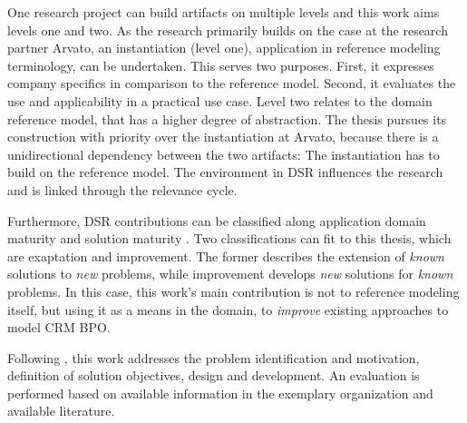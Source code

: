 One research project can build artifacts on multiple levels \citep{gregor2013positioning} and this work aims levels one and two. As the research primarily builds on the case at the research partner Arvato, an instantiation (level one), \viz application in reference modeling terminology, can be undertaken. This serves two purposes. First, it expresses company specifics in comparison to the reference model. Second, it evaluates the use and applicability in a practical use case.  Level two relates to the domain reference model, that has a higher degree of abstraction. The thesis pursues its construction with priority over the instantiation at Arvato, because there is a unidirectional dependency between the two artifacts: The instantiation has to build on the reference model. The environment in \acrshort{DSR} influences the research and is linked through the relevance cycle. 

Furthermore, \acrshort{DSR} contributions can be classified along application domain maturity and solution maturity \citep{gregor2013positioning}. Two classifications can fit to this thesis, which are exaptation and improvement. The former describes the extension of \textit{known} solutions to \textit{new} problems, while improvement develops \textit{new} solutions for \textit{known} problems. In this case, this work's main contribution is not to reference modeling itself, but using it as a means in the domain, to \textit{improve} existing approaches to model CRM BPO. 

Following \citeauthor{Hevner2004,Peffers2007}, this work addresses the problem identification and motivation, definition of solution objectives,  design and development. An evaluation is performed based on available information in the exemplary organization and available literature. 



